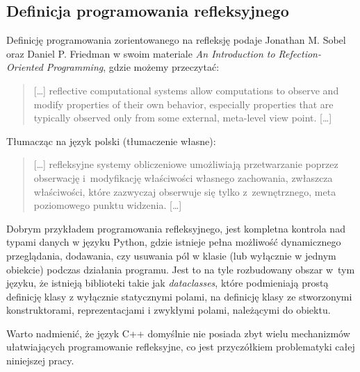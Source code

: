 \documentclass[12pt]{article}
\newcommand{\nonpl}[1]{{\it #1}}
\begin{document}
{		{
			\newpage
			\subsection{Definicja programowania refleksyjnego}

			Definicję programowania zorientowanego na refleksję podaje Jonathan M. Sobel oraz Daniel P. Friedman
			w swoim materiale \nonpl{An Introduction to Refection-Oriented Programming}\cite{reflection_definition},
			gdzie możemy przeczytać:

			\begin{quotation}
				[\ldots] reflective computational systems allow computations to observe and modify properties
				of their own behavior, especially properties that are typically observed only from some
				external, meta-level view point. [\ldots]
			\end{quotation}

			{\noindent Tłumacząc na język polski (tłumaczenie własne):}

			\begin{quotation}
				[\ldots] refleksyjne systemy obliczeniowe umożliwiają przetwarzanie poprzez obserwację i~modyfikację
				właściwości własnego zachowania, zwłaszcza właściwości, które zazwyczaj obserwuje się tylko z~zewnętrznego,
				meta poziomowego punktu widzenia. [\ldots]
			\end{quotation}

			Dobrym przykładem programowania refleksyjnego, jest kompletna kontrola nad typami danych w języku Python,
			gdzie istnieje pełna możliwość dynamicznego przeglądania, dodawania, czy usuwania pól w klasie (lub wyłącznie w jednym obiekcie)
			podczas działania programu. Jest to na tyle rozbudowany obszar w~tym języku, że istnieją biblioteki takie jak
			\nonpl{dataclasses}\cite{python_dataclass}, które podmieniają prostą definicję klasy z wyłącznie statycznymi polami,
			na definicję klasy ze stworzonymi konstruktorami, reprezentacjami i zwykłymi polami, należącymi do obiektu.

			Warto nadmienić, że język C++ domyślnie nie posiada zbyt wielu mechanizmów ułatwiających programowanie refleksyjne,
			co jest przyczółkiem problematyki całej niniejszej pracy.
		}
	}
\end{document}
